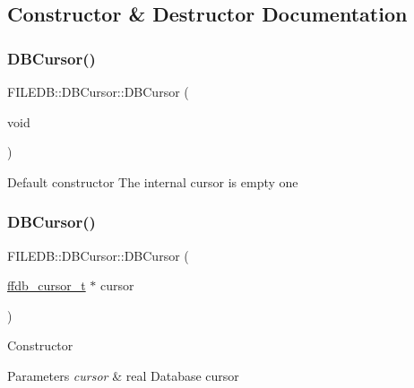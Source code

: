 \subsection{Constructor \& Destructor Documentation}
\mbox{\label{classFILEDB_1_1DBCursor_aba0d95e9eb892acd1722ca46e481459d}} 
\subsubsection{\texorpdfstring{DBCursor()}{DBCursor()}\hspace{0.1cm}{\footnotesize\ttfamily [1/9]}}
{\footnotesize\ttfamily F\+I\+L\+E\+D\+B\+::\+D\+B\+Cursor\+::\+D\+B\+Cursor (\begin{DoxyParamCaption}\item[{void}]{ }\end{DoxyParamCaption})}

Default constructor The internal cursor is empty one \mbox{\label{classFILEDB_1_1DBCursor_aaa004d2a0c3ddb6b8df9f31600c29a3b}} 
\subsubsection{\texorpdfstring{DBCursor()}{DBCursor()}\hspace{0.1cm}{\footnotesize\ttfamily [2/9]}}
{\footnotesize\ttfamily F\+I\+L\+E\+D\+B\+::\+D\+B\+Cursor\+::\+D\+B\+Cursor (\begin{DoxyParamCaption}\item[{\mbox{\hyperlink{adat-devel_2other__libs_2filedb_2filehash_2ffdb__db_8h_a1383f6fb3966b0ca74206ba93b687fd9}{ffdb\+\_\+cursor\+\_\+t}} $\ast$}]{cursor }\end{DoxyParamCaption})}

Constructor 
\begin{DoxyParams}{Parameters}
{\em cursor} & real Database cursor \\
\hline
\end{DoxyParams}
\mbox{\label{classFILEDB_1_1DBCursor_ae65ab90dc14febbbfa277bfd0e1533db}} 
